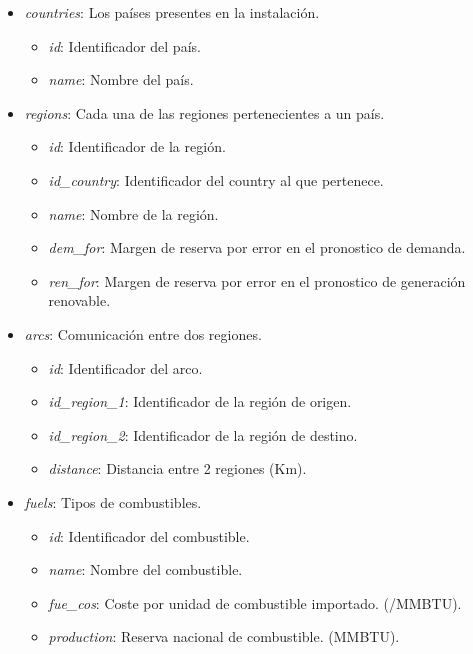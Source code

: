 \begin{itemize}
	
	\item \textit{countries}: Los países presentes en la instalación.
	\begin{itemize}
		\item \textit{id}: Identificador del país.		
		\item \textit{name}: Nombre del país.
	\end{itemize}
	
	\item \textit{regions}: Cada una de las regiones pertenecientes a un país.
	\begin{itemize}
		\item \textit{id}: Identificador de la región.		
		\item \textit{id\_country}: Identificador del country al que pertenece.
		\item \textit{name}: Nombre de la región.
		\item \textit{dem\_for}: Margen de reserva por error en el pronostico de demanda.
		\item \textit{ren\_for}: Margen de reserva por error en el pronostico de generación renovable.
	\end{itemize}

	\item \textit{arcs}: Comunicación entre dos regiones.
	\begin{itemize}
		\item \textit{id}: Identificador del arco.		
		\item \textit{id\_region\_1}: Identificador de la región de origen.
		\item \textit{id\_region\_2}: Identificador de la región de destino.
		\item \textit{distance}: Distancia entre 2 regiones (Km).
	\end{itemize}
	
	\item \textit{fuels}: Tipos de combustibles.
	\begin{itemize}
		\item \textit{id}: Identificador del combustible.		
		\item \textit{name}: Nombre del combustible.
		\item \textit{fue\_cos}: Coste por unidad de combustible importado. (\textdollar/MMBTU).
		\item \textit{production}: Reserva nacional de combustible. (MMBTU).
	\end{itemize}
	

\end{itemize}

